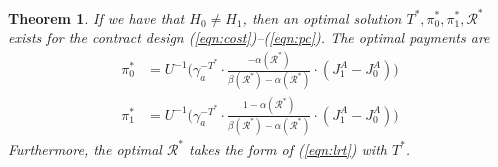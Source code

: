 \documentclass[letterpaper, 10 pt, conference]{ieeeconf}  %
\newtheorem{theorem}{Theorem}
\begin{document}
\begin{theorem}
\label{thm:lrtopt}
If we have that $H_0 \neq H_1$, then an optimal solution $T^*, \pi_0^*, \pi_1^*, \mathcal{R}^*$ exists for the contract design (\ref{eqn:cost})--(\ref{eqn:pc}). The optimal payments are
\begin{align}
\pi_0^* &= \textstyle U^{-1}\Big(\gamma_a^{-T^*}\cdot\frac{-\alpha(\mathcal{R}^*)}{\beta(\mathcal{R}^*) - \alpha(\mathcal{R}^*)}\cdot(J_1^A-J_0^A)\Big)\label{eqn:pi0star}\\
\pi_1^* &= \textstyle U^{-1}\Big(\gamma_a^{-T^*}\cdot\frac{1-\alpha(\mathcal{R}^*)}{\beta(\mathcal{R}^*) - \alpha(\mathcal{R}^*)}\cdot(J_1^A-J_0^A)\Big)\label{eqn:pi1star}
\end{align}
Furthermore, the optimal $\mathcal{R}^*$ takes the form of (\ref{eqn:lrt}) with $T^*$.
\end{theorem}
\end{document}
